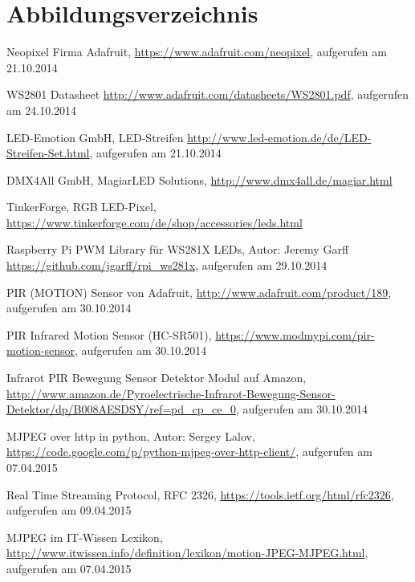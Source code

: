\pagebreak
\section{Abbildungsverzeichnis}
\listoffigures
\clearpage

\lstlistoflistings
\clearpage

\begin{thebibliography}{x}

   Neopixel Firma Adafruit, \url{https://www.adafruit.com/neopixel}, aufgerufen am 21.10.2014
  
   WS2801 Datasheet \url{http://www.adafruit.com/datasheets/WS2801.pdf}, aufgerufen am 24.10.2014
  
   LED-Emotion GmbH, LED-Streifen \url{http://www.led-emotion.de/de/LED-Streifen-Set.html}, aufgerufen am 21.10.2014
  
   DMX4All GmbH, MagiarLED Solutions, \url{http://www.dmx4all.de/magiar.html}
  
  TinkerForge, RGB LED-Pixel, \url{https://www.tinkerforge.com/de/shop/accessories/leds.html}
  
   Raspberry Pi PWM Library für WS281X LEDs, Autor: Jeremy Garff \url{https://github.com/jgarff/rpi_ws281x}, aufgerufen am 29.10.2014
  
   PIR (MOTION) Sensor von Adafruit, \url{http://www.adafruit.com/product/189}, aufgerufen am 30.10.2014
  
  PIR Infrared Motion Sensor (HC-SR501), \url{https://www.modmypi.com/pir-motion-sensor}, aufgerufen am 30.10.2014
  
  Infrarot PIR Bewegung Sensor Detektor Modul auf Amazon, \url{http://www.amazon.de/Pyroelectrische-Infrarot-Bewegung-Sensor-Detektor/dp/B008AESDSY/ref=pd\_cp\_ce\_0}, aufgerufen am 30.10.2014
  
   MJPEG over http in python, Autor:  Sergey Lalov, \url{https://code.google.com/p/python-mjpeg-over-http-client/}, aufgerufen am 07.04.2015 
  
   Real Time Streaming Protocol, RFC 2326, \url{https://tools.ietf.org/html/rfc2326}, aufgerufen am 09.04.2015
  
   MJPEG im IT-Wissen Lexikon, \url{http://www.itwissen.info/definition/lexikon/motion-JPEG-MJPEG.html}, aufgerufen am 07.04.2015
  

\end{thebibliography}
